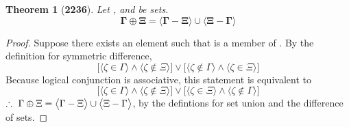 \documentclass[preview]{standalone}
\newtheorem{theorem}{Theorem}
\begin{document}
\begin{theorem}[\textbf{2236}]
    Let \bm{$\Gamma$}, and \bm{$\Xi$} be sets. 
    \begin{equation*}
        \bm{
            \Gamma \oplus \Xi 
                = 
            \Big \langle \Gamma - \Xi \Big \rangle
                \cup 
            \Big \langle \Xi - \Gamma \Big \rangle
        }
    \end{equation*}
\end{theorem}
\begin{proof}
    Suppose there exists an element \bm{$\zeta$} such that \bm{$\zeta$} is a member of \bm{$\Gamma \oplus \Xi$}. 
    By the definition for symmetric difference,
    \begin{equation*}
        \bigg[
            \Big \langle \zeta \in \Gamma \Big \rangle 
                \land 
            \Big \langle \zeta \notin \Xi \Big \rangle
        \bigg] 
            \lor 
        \bigg[
            \Big \langle \zeta \notin \Gamma \Big \rangle
                \land 
            \Big \langle \zeta \in \Xi \Big \rangle
        \bigg]   
    \end{equation*}
    Because logical conjunction is associative, this statement is equivalent to 
    \begin{equation*}
        \bigg[
            \Big \langle \zeta \in \Gamma \Big \rangle 
                \land 
            \Big \langle \zeta \notin \Xi \Big \rangle
        \bigg] 
            \lor 
        \bigg[
            \Big \langle \zeta \in \Xi \Big \rangle
                \land 
            \Big \langle \zeta \notin \Gamma \Big \rangle
        \bigg]   
    \end{equation*}
    $\therefore \text{\space} \relax{
        \Gamma \oplus \Xi 
        = 
    \big \langle \Gamma - \Xi \big \rangle
        \cup 
    \big \langle \Xi - \Gamma \big \rangle
    }$, by the defintions for set union and the difference of sets.
\end{proof}
\end{document}
